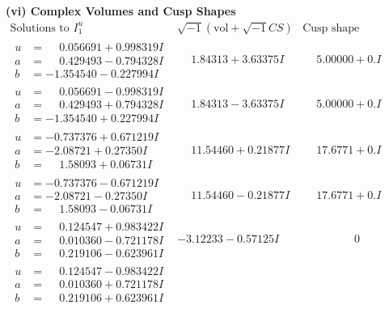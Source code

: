 \documentclass[1p]{elsarticle_modified}
\theoremstyle{definition}
\newcommand{\I}{\sqrt{-1}}
\begin{document}
\newpage\flushleft \textbf{(vi) Complex Volumes and Cusp Shapes}
$$\begin{array}{c|c|c}  
\text{Solutions to }I^u_{1}& \I (\text{vol} + \sqrt{-1}CS) & \text{Cusp shape}\\
 \hline 
\begin{aligned}
u &= \phantom{-}0.056691 + 0.998319 I \\
a &= \phantom{-}0.429493 - 0.794328 I \\
b &= -1.354540 - 0.227994 I\end{aligned}
 & \phantom{-}1.84313 + 3.63375 I & \phantom{-}5.00000 + 0. I\phantom{ +0.000000I} \\ \hline\begin{aligned}
u &= \phantom{-}0.056691 - 0.998319 I \\
a &= \phantom{-}0.429493 + 0.794328 I \\
b &= -1.354540 + 0.227994 I\end{aligned}
 & \phantom{-}1.84313 - 3.63375 I & \phantom{-}5.00000 + 0. I\phantom{ +0.000000I} \\ \hline\begin{aligned}
u &= -0.737376 + 0.671219 I \\
a &= -2.08721 + 0.27350 I \\
b &= \phantom{-}1.58093 + 0.06731 I\end{aligned}
 & \phantom{-}11.54460 + 0.21877 I & \phantom{-}17.6771 + 0. I\phantom{ +0.000000I} \\ \hline\begin{aligned}
u &= -0.737376 - 0.671219 I \\
a &= -2.08721 - 0.27350 I \\
b &= \phantom{-}1.58093 - 0.06731 I\end{aligned}
 & \phantom{-}11.54460 - 0.21877 I & \phantom{-}17.6771 + 0. I\phantom{ +0.000000I} \\ \hline\begin{aligned}
u &= \phantom{-}0.124547 + 0.983422 I \\
a &= \phantom{-}0.010360 - 0.721178 I \\
b &= \phantom{-}0.219106 - 0.623961 I\end{aligned}
 & -3.12233 - 0.57125 I & \phantom{-0.000000 } 0 \\ \hline\begin{aligned}
u &= \phantom{-}0.124547 - 0.983422 I \\
a &= \phantom{-}0.010360 + 0.721178 I \\
b &= \phantom{-}0.219106 + 0.623961 I\end{aligned}

\end{array}$$
\end{document}
